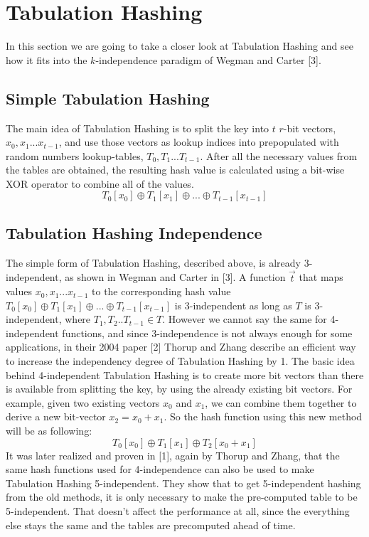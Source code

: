 \documentclass[11pt]{article}
\begin{document}
\section{Tabulation Hashing}
In this section we are going to take a closer look at Tabulation Hashing and see how it fits into the $k$-independence paradigm of Wegman and Carter [3]. 
\subsection{Simple Tabulation Hashing}
The main idea of Tabulation Hashing is to split the key into $t$ $r$-bit vectors, $x_{0}, x_{1} ... x_{t-1}$, and use those vectors as lookup indices into prepopulated with random numbers lookup-tables, $T_{0}, T_{1} ... T_{t-1}$. After all the necessary values from the tables are obtained, the resulting hash value is calculated using a bit-wise XOR operator to combine all of the values. $$T_{0}[x_{0}] \oplus T_{1}[x_{1}]  \oplus ... \oplus T_{t-1}[x_{t-1}]  $$

\subsection{Tabulation Hashing Independence}
The simple form of Tabulation Hashing, described above, is already 3-independent, as shown in Wegman and Carter in [3]. A function $\vec{t}$ that maps values  $x_{0}, x_{1} ... x_{t-1}$ to the corresponding hash value $T_{0}[x_{0}] \oplus T_{1}[x_{1}]  \oplus ... \oplus T_{t-1}[x_{t-1}]  $ is 3-independent as long as $T$ is 3-independent, where $T_{1}, T_{2} .. T_{t-1} \in T$. However we cannot say the same for 4-independent functions, and since 3-independence is not always enough for some applications, in their 2004 paper [2] Thorup and Zhang describe an efficient way to increase the independency degree of Tabulation Hashing by 1. The basic idea behind 4-independent Tabulation Hashing is to create more bit vectors than there is available from splitting the key, by using the already existing bit vectors. For example, given two existing vectors $x_{0}$ and $x_{1}$, we can combine them together to derive a new bit-vector $x_{2} = x_{0} + x_{1}$. So the hash function using this new method will be as following: $$T_{0}[x_{0}] \oplus T_{1}[x_{1}] \oplus T_{2}[x_{0} + x_{1}]$$ It was later realized and proven in [1], again by Thorup and Zhang, that the same hash functions used for 4-independence can also be used to make Tabulation Hashing 5-independent. They show that to get 5-independent hashing from the old methods, it is only necessary to make the pre-computed table to be 5-independent. That doesn't affect the performance at all, since the everything else stays the same and the tables are precomputed ahead of time. 
\end{document}
